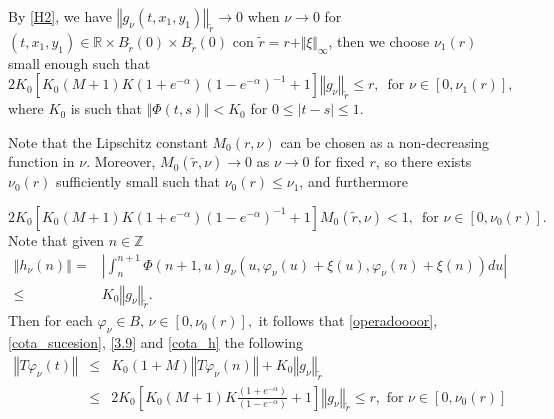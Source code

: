 \documentclass[english,,reqno]{amsart}
\numberwithin{equation}{section}
\theoremstyle{plain}
\theoremstyle{definition}
\theoremstyle{remark}
\begin{document}
By \ref{H2}, we have $\left\Vert g_{\nu}\left(t,x_{1},y_{1}\right)\right\Vert_{\tilde{r}} \rightarrow0$
when $\nu\rightarrow0$ for $\left(t,x_{1},y_{1}\right)\in\mathbb{R}\times B_{\tilde{r}}(0)\times B_{\tilde{r}}(0)$ con  $\tilde{r}=r+\Vert \xi \Vert_{\infty}$, then we choose $\nu_{1}\left(r\right)$ small enough such that
\begin{equation}
2K_{0}\left[K_{0}\left(M+1\right)K\left(1+e^{-\alpha}\right)\left(1-e^{-\alpha}\right)^{-1}+1\right] \left\Vert g_{\nu}\right\Vert_{\tilde{r}} \leq r,\,\,\,\mbox{for }\nu\in\left[0,\nu_{1}\left(r\right)\right],\label{3.9}
\end{equation}
where  $K_0$ is such that $\Vert \Phi(t,s) \Vert<K_0$ for $0\leq \vert t-s\vert \leq 1$.

Note that the Lipschitz constant $M_{0}(r,\nu)$ can be chosen as a non-decreasing function in $\nu$.  
Moreover, $M_{0}(\tilde{r},\nu) \rightarrow 0$ as $\nu \rightarrow 0$ for fixed $r$,  
so there exists $\nu_0(r)$ sufficiently small such that $\nu_0(r) \leq \nu_1$, and furthermore

\begin{equation}
2K_{0}\left[K_{0}\left(M+1\right)K\left(1+e^{-\alpha}\right)\left(1-e^{-\alpha}\right)^{-1}+1\right]M_{0}\left(\tilde{r},\nu\right)<1,\,\,\,\mbox{for }\nu\in\left[0,\nu_{0}(r)\right].\label{eq:3.8}
\end{equation}
Note that given $n\in\mathbb{Z}$
\begin{equation}\label{cota_h}
\begin{aligned}
\left\Vert h_{\nu}\left(n\right)\right\Vert   = & \left|\int_{n}^{n+1}\Phi\left(n+1,u\right)g_{\nu}\left(u,\varphi_{\nu}\left(u\right)+\xi\left(u\right),\varphi_{\nu}\left(n\right)+\xi\left(n\right)\right)du\right|\\
  \leq & K_{0}\left\Vert g_{\nu}\right\Vert_{\tilde{r}} .
\end{aligned}
\end{equation}
Then for each $\varphi_{\nu}\in B,\,\nu\in\left[0,\nu_{0}\left(r\right)\right],$
it follows that \eqref{operadoooor}, \eqref{cota_sucesion}, \eqref{3.9}   and \eqref{cota_h} the following
\begin{eqnarray*}
\left\Vert T\varphi_{\nu}\left(t\right)\right\Vert 
&\leq& K_{0}\left(1+M\right)\left\Vert T\varphi_{\nu}\left(n\right)\right\Vert +K_{0}\left\Vert g_{\nu}\right\Vert _{\tilde{r}} \nonumber \\
&\leq& 2K_{0}\left[K_{0}\left(M+1\right)K\frac{\left(1+e^{-\alpha}\right)}{\left(1-e^{-\alpha}\right)}+1\right]\left\Vert g_{\nu}\right\Vert_{\tilde{r}} \leq r,\,\,\mbox{for }\nu\in\left[0,\nu_{0}\left(r\right)\right]\label{eq:3.11}
\end{eqnarray*}
\end{document}
